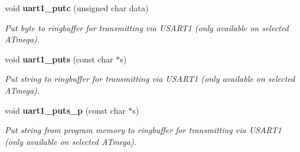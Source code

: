 \begin{CompactItemize}
void {\bf uart1\_\-putc} (unsigned char data)
\begin{CompactList}\small\item\em Put byte to ringbuffer for transmitting via USART1 (only available on selected ATmega). \item\end{CompactList}\item 
void {\bf uart1\_\-puts} (const char $\ast$s)
\begin{CompactList}\small\item\em Put string to ringbuffer for transmitting via USART1 (only available on selected ATmega). \item\end{CompactList}\item 
void {\bf uart1\_\-puts\_\-p} (const char $\ast$s)
\begin{CompactList}\small\item\em Put string from program memory to ringbuffer for transmitting via USART1 (only available on selected ATmega). \item\end{CompactList}\end{CompactItemize}
